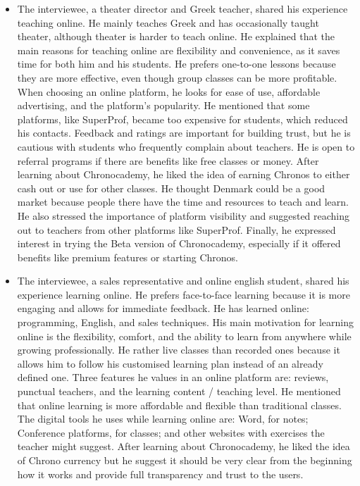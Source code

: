 \begin{itemize}
    \item The interviewee, a theater director and Greek teacher, shared his experience teaching online.
    He mainly teaches Greek and has occasionally taught theater, although theater is harder to teach online.
    He explained that the main reasons for teaching online are flexibility and convenience, as it saves time for both him and his students.
    He prefers one-to-one lessons because they are more effective, even though group classes can be more profitable.
    When choosing an online platform, he looks for ease of use, affordable advertising, and the platform’s popularity.
    He mentioned that some platforms, like SuperProf, became too expensive for students, which reduced his contacts.
    Feedback and ratings are important for building trust, but he is cautious with students who frequently complain about teachers.
    He is open to referral programs if there are benefits like free classes or money.
    After learning about Chronocademy, he liked the idea of earning Chronos to either cash out or use for other classes.
    He thought Denmark could be a good market because people there have the time and resources to teach and learn.
    He also stressed the importance of platform visibility and suggested reaching out to teachers from other platforms like SuperProf.
    Finally, he expressed interest in trying the Beta version of Chronocademy, especially if it offered benefits like premium features or starting Chronos.
    \item The interviewee, a sales representative and online english student, shared his experience learning online.
    He prefers face-to-face learning because it is more engaging and allows for immediate feedback.
    He has learned online: programming, English, and sales techniques.
    His main motivation for learning online is the flexibility, comfort, and the ability to learn from anywhere while growing professionally.
    He rather live classes than recorded ones because it allows him to follow his customised learning plan instead of an already defined one.
    Three features he values in an online platform are: reviews, punctual teachers, and the learning content / teaching level.
    He mentioned that online learning is more affordable and flexible than traditional classes.
    The digital tools he uses while learning online are: Word, for notes; Conference platforms, for classes; and other websites with exercises the teacher might suggest.
    After learning about Chronocademy, he liked the idea of Chrono currency but he suggest it should be very clear from the beginning how it works and provide full transparency and trust to the users.

\end{itemize}
